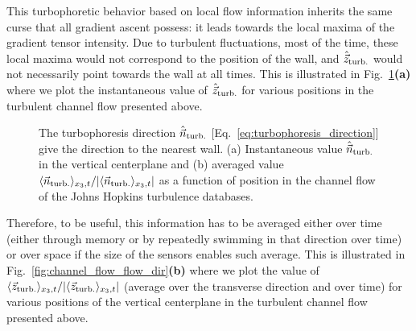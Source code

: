 This turbophoretic behavior based on local flow information inherits the same curse that all gradient ascent possess: it leads towards the local maxima of the gradient tensor intensity.
Due to turbulent fluctuations, most of the time, these local maxima would not correspond to the position of the wall, and $\hat{\vec{z}}_{\mathrm{turb.}}$ would not necessarily point towards the wall at all times.
This is illustrated in Fig.~\ref{fig:channel_flow_grad_norm_dir}\textbf{(a)} where we plot the instantaneous value of $\hat{\vec{z}}_{\mathrm{turb.}}$ for various positions in the turbulent channel flow presented above.
\begin{figure}%
	\centering
	
	\caption{
		The turbophoresis direction $\hat{\vec{n}}_{\mathrm{turb.}}$ [Eq.~\eqref{eq:turbophoresis_direction}] give the direction to the nearest wall.
		(a) Instantaneous value $\hat{\vec{n}}_{\mathrm{turb.}}$ in the vertical centerplane and (b) averaged value $\langle \vec{n}_{\mathrm{turb.}} \rangle_{x_3,t} / \lvert\langle \vec{n}_{\mathrm{turb.}} \rangle_{x_3,t}\rvert$ as a function of position in the channel flow of the Johns Hopkins turbulence databases.
	}
	\label{fig:channel_flow_grad_norm_dir}
\end{figure}
Therefore, to be useful, this information has to be averaged either over time (either through memory or by repeatedly swimming in that direction over time) or over space if the size of the sensors enables such average.
This is illustrated in Fig.~\ref{fig:channel_flow_flow_dir}\textbf{(b)} where we plot the value of $\langle \vec{z}_{\mathrm{turb.}} \rangle_{x_3,t} / \lvert\langle \vec{z}_{\mathrm{turb.}} \rangle_{x_3,t}\rvert$ (average over the transverse direction and over time) for various positions of the vertical centerplane in the turbulent channel flow presented above.

